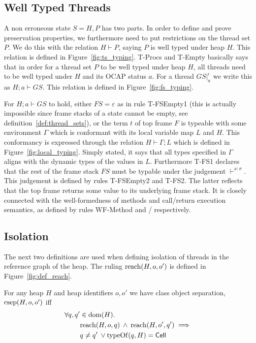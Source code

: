 \subsection{Well Typed Threads}%
\label{sub:well_typed_threads}

A non erroneous state $S = H, P$ has two parts. In order to define and
prove preservation properties, we furthermore need to put restrictions on the
thread set $P$. We do this with the relation $H \vdash P$, saying $P$ is well
typed under heap $H$. This relation is defined in Figure~\ref{fig:ts_typing}.
{\sc T-Procs} and {\sc T-Empty} basically says that in order for a thread set
$P$ to be well typed under heap $H$, all threads need to be well typed under
$H$ and its OCAP status $a$.  For a thread $GS|_a^\iota$ we write this as $H; a
\vdash GS$. This relation is defined in Figure~\ref{fig:fs_typing}. 

For $H; a \vdash GS$ to hold, either $FS = \varepsilon$ as in rule {\sc
T-FSEmpty1} (this is actually impossible since frame stacks of a state cannot be
empty, see definition~\ref{def:thread_sets}), or the term $t$ of top frame $F$
is typeable with some environment $\Gamma$ which is conformant with its local
variable map $L$ and $H$. This conformancy is expressed through the relation $H
\vdash \Gamma; L$ which is defined in Figure~\ref{fig:local_typing}. Simply
stated, it says that all types specified in $\Gamma$ aligns with the dynamic
types of the values in $L$. Furthermore {\sc T-FS1} declares that the rest of the frame
stack $FS$ must be typable under the judgement $\vdash^{x: \sigma}$. This
judgement is defined by rules {\sc T-FSEmpty2} and {\sc T-FS2}. The latter
reflects that the top frame returns some value to its underlying frame stack. It
is closely connected with the well-formedness of methods and call\slash return
execution semantics, as defined by rules {\sc WF-Method} and \ECall{}\slash\ERet{}
respectively.

\subsection{Isolation}%
\label{sub:isolation}

The next two definitions are used when defining isolation of threads in the
reference graph of the heap. The ruling $\mbox{$\mathrm{reach}$}(H, o, o')$ is defined in
Figure~\ref{fig:def_reach}.
\begin{definition}
  For any heap $H$ and heap identifiers $o, o'$ we have class object separation,
  $\mbox{$\mathrm{csep}$}{(H, o, o')}$ iff
  \begin{align}
    \label{eq:csep_def}
    \forall q, q' &\in \mbox{$\mathrm{dom}$}{(H)}. \notag\\
    & \mbox{$\mathrm{reach}$}{(H, o, q)} \: \land \: \mbox{$\mathrm{reach}$}{(H, o', q')} \implies \notag\\ 
    &q \neq q' \: \lor \mbox{$\mathrm{typeOf}$}{(q, H)} = \mbox{$\mathsf{Cell}$}
  \end{align}
\end{definition}

